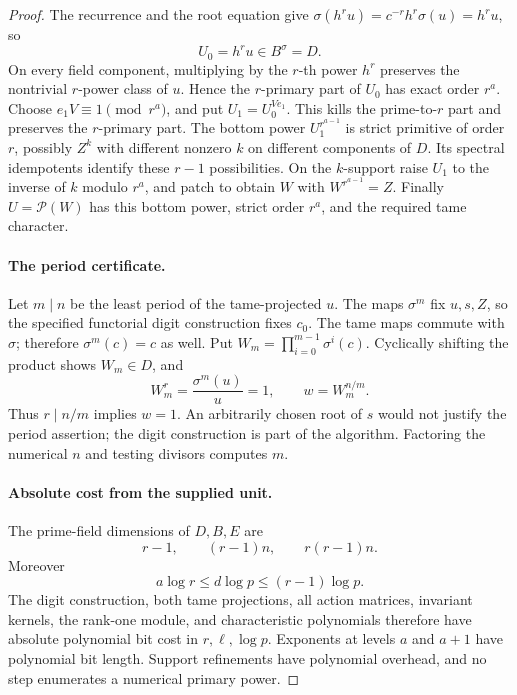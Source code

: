 \documentclass[11pt]{article}
\theoremstyle{definition}
\theoremstyle{remark}
\begin{document}
\begin{proof}
The recurrence and the root equation give
\(\sigma(h^r u)=c^{-r}h^r\sigma(u)=h^r u\), so
\[
                         U_0=h^r u\in B^\sigma=D.
\]
On every field component, multiplying by the \(r\)-th power
\(h^r\) preserves the nontrivial \(r\)-power class of \(u\).
Hence the \(r\)-primary part of \(U_0\) has exact order \(r^a\).
Choose \(e_1V\equiv1\pmod{r^a}\), and put \(U_1=U_0^{Ve_1}\).
This kills the prime-to-\(r\) part and preserves the \(r\)-primary
part.  The bottom power \(U_1^{r^{a-1}}\) is strict primitive
of order \(r\), possibly \(Z^k\) with different nonzero \(k\)
on different components of \(D\).
Its spectral idempotents identify these \(r-1\) possibilities.
On the \(k\)-support raise \(U_1\) to the inverse of \(k\)
modulo \(r^a\), and patch to obtain \(W\) with
\(W^{r^{a-1}}=Z\).
Finally \(U=\mathcal P(W)\) has this bottom power, strict
order \(r^a\), and the required tame character.

\paragraph{The period certificate.}
Let \(m\mid n\) be the least period of the tame-projected \(u\).
The maps \(\sigma^m\) fix \(u,s,Z\), so the specified
functorial digit construction fixes \(c_0\).
The tame maps commute with \(\sigma\); therefore
\(\sigma^m(c)=c\) as well.
Put \(W_m=\prod_{i=0}^{m-1}\sigma^i(c)\).
Cyclically shifting the product shows \(W_m\in D\), and
\[
             W_m^r=\frac{\sigma^m(u)}u=1,\qquad
             w=W_m^{n/m}.
\]
Thus \(r\mid n/m\) implies \(w=1\).
An arbitrarily chosen root of \(s\) would not justify the
period assertion; the digit construction is part of the algorithm.
Factoring the numerical \(n\) and testing divisors computes \(m\).

\paragraph{Absolute cost from the supplied unit.}
The prime-field dimensions of \(D,B,E\) are
\[
                   r-1,\qquad (r-1)n,\qquad r(r-1)n.
\]
Moreover
\[
                 a\log r\leq d\log p\leq(r-1)\log p.
\]
The digit construction, both tame projections, all action matrices,
invariant kernels, the rank-one module, and characteristic
polynomials therefore have absolute polynomial bit cost in
\(r,\ell,\log p\).  Exponents at levels \(a\) and \(a+1\)
have polynomial bit length.  Support refinements have polynomial
overhead, and no step enumerates a numerical primary power.


\end{proof}
\end{document}
